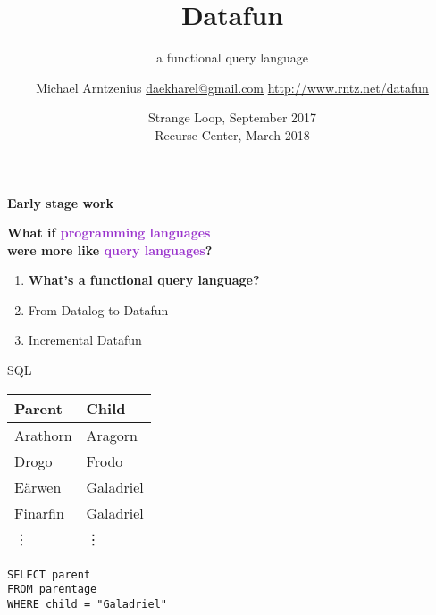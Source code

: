 \documentclass[xcolor=table,usenames,dvipsnames,svgnames]{beamer}
\title{Datafun}
\subtitle{a functional query language}
\author{Michael Arntzenius
  \newline\href{mailto:daekharel@gmail.com}{daekharel@gmail.com}
  \newline\url{http://www.rntz.net/datafun}}
\date{Strange Loop, September 2017\\
Recurse Center, March 2018}
\begin{document}
\maketitle


\begin{frame}\centering\LARGE\bf Early stage work \end{frame}

\begin{frame}\LARGE \centering
  \textbf{What if \textcolor{DarkOrchid}{programming languages}\\
    were more like \textcolor{DarkOrchid}{query languages}?}


\end{frame}


\begin{frame}\Large
  \begin{enumerate}
    \itemsep 1.5em
  \item {\bf What's a functional query language?}
  \item From Datalog to Datafun
  \item Incremental Datafun
  \end{enumerate}
\end{frame}


\begin{frame}{SQL}\large
  \begin{minipage}{0.4\textwidth}
    \centering
    \begin{tabular}{l|l}
      \textbf{Parent} & \textbf{Child}\\\hline
      Arathorn & Aragorn\\
      Drogo & Frodo\\
      E\"arwen & Galadriel\\
      Finarfin & Galadriel\\
      \hfill\vdots & \hfill\vdots
    \end{tabular}
  \end{minipage}
  \hfill
  \begin{minipage}{0.51\textwidth}
    \texttt{SELECT parent\\FROM parentage\\WHERE child = "Galadriel"}
  \end{minipage}
\end{frame}
\end{document}
